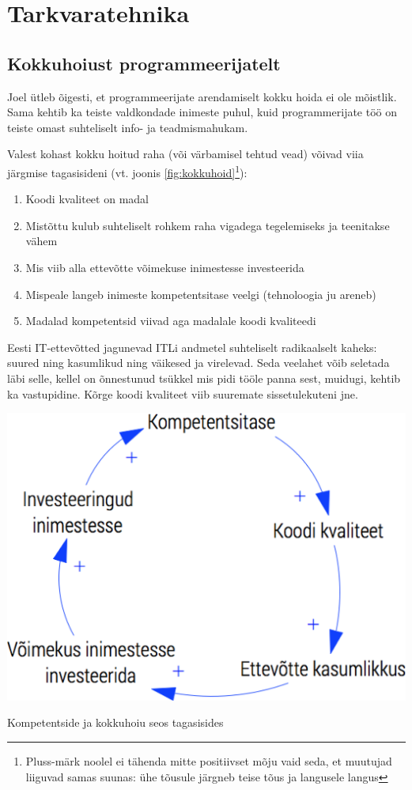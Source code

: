 \documentclass{tufte-book}
\begin{document}
\chapter{Tarkvaratehnika}
\section{Kokkuhoiust programmeerijatelt}
\label{sec:kokkuhoid}
Joel ütleb õigesti, et programmeerijate arendamiselt kokku hoida ei ole mõistlik. Sama kehtib ka teiste valdkondade inimeste puhul, kuid programmerijate töö on teiste omast suhteliselt info- ja teadmismahukam.

Valest kohast kokku hoitud raha (või värbamisel tehtud vead) võivad viia järgmise tagasisideni (vt. joonis \ref{fig:kokkuhoid}\footnote{Pluss-märk noolel ei tähenda mitte positiivset mõju vaid seda, et muutujad liiguvad samas suunas: ühe tõusule järgneb teise tõus ja langusele langus}):
\begin{enumerate}
	\item Koodi kvaliteet on madal
	\item Mistõttu kulub suhteliselt rohkem raha vigadega tegelemiseks ja teenitakse vähem
	\item Mis viib alla ettevõtte võimekuse inimestesse investeerida
	\item Mispeale langeb inimeste kompetentsitase veelgi (tehnoloogia ju areneb)
	\item Madalad kompetentsid viivad aga madalale koodi kvaliteedi
\end{enumerate}

Eesti IT-ettevõtted jagunevad ITLi andmetel suhteliselt radikaalselt kaheks: suured ning kasumlikud ning väikesed ja virelevad. Seda veelahet võib seletada läbi selle, kellel on õnnestunud tsükkel mis pidi tööle panna sest, muidugi, kehtib ka vastupidine. Kõrge koodi kvaliteet viib suuremate sissetulekuteni jne.

\begin{marginfigure}
		\includegraphics[width=\linewidth]{kvaliteet.png}
		\caption{Kompetentside ja kokkuhoiu seos tagasisides}
		\label{fig:kokkuhoid}
\end{marginfigure}
\end{document}
